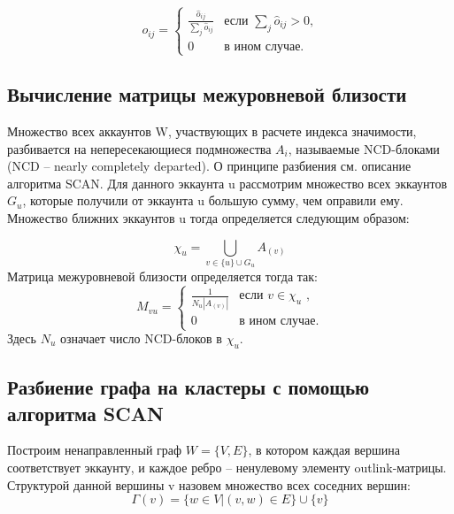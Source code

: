 \documentclass[a4paper,12pt]{article}
\begin{document}
$$
o_{ij} = \begin{cases}
 \frac{\hat{o}_{ij}} {\sum\limits_{j} \hat{o}_{ij}}
 & \text{если $\sum\limits_{j} \hat{o}_{ij}> 0$,}\\
 0 & \text{в ином случае.}
\end{cases} 
$$

\subsection{Вычисление матрицы межуровневой близости}

Множество всех аккаунтов W, участвующих в расчете индекса значимости, разбивается на непересекающиеся подмножества $A_i$, называемые NCD-блоками (NCD – nearly completely departed). О принципе разбиения см. описание алгоритма SCAN. 
Для данного эккаунта u рассмотрим множество всех эккаунтов $G_u$, которые получили от эккаунта u большую сумму, чем оправили ему. Множество ближних эккаунтов u тогда определяется следующим образом:

$$
\chi_u = \bigcup_{v \in \{u\} \cup G_u} A_{(v)}
$$
Матрица межуровневой близости определяется тогда так:
$$
M_{vu}=\begin{cases}
 \frac{1}{N_u |A_{(v)}|}
 & \text{если $v \in \chi_u$ ,}\\
 0 & \text{в ином случае.}
\end{cases}
$$
Здесь $N_u$ означает число NCD-блоков в $\chi_u$.

\subsection{Разбиение графа на кластеры с помощью алгоритма SCAN}
Построим ненаправленный граф $W = \{V, E\}$, в котором каждая вершина соответствует эккаунту, и каждое ребро – ненулевому элементу outlink-матрицы.
Структурой данной вершины v назовем множество всех соседних вершин:
$$
\Gamma(v)=\{w \in V|(v,w) \in E\} \cup \{v\}
$$
\end{document}
